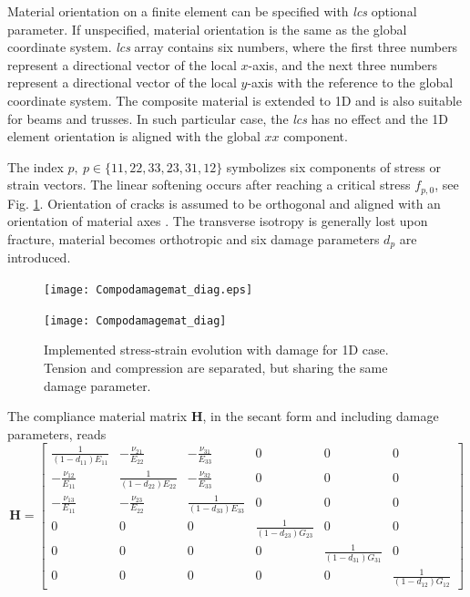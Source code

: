 \documentclass[a4paper]{article}
\newcommand{\param}[1]{{\it #1}}
\begin{document}
Material orientation on a finite element can be specified with \param{lcs} optional parameter. If unspecified, material orientation is the same as the global coordinate system. \param{lcs} array contains six numbers,
where the first three numbers represent a directional vector of the local $x$-axis, and the next three numbers represent a directional vector of the local $y$-axis with the reference to the global coordinate system. The composite material is extended to 1D and is also suitable for beams and trusses. In such particular case, the \param{lcs} has no effect and the 1D element orientation is aligned with the global $xx$ component.

The index $p,~p\in\{11,22,33,23,31,12\}$ symbolizes six components of stress or strain vectors. The linear softening occurs after reaching a critical stress $f_{p,0}$, see Fig. \ref{comp_softening}. Orientation of cracks is assumed to be orthogonal and aligned with an orientation of material axes \cite[pp.236]{Bazant:98}. The transverse isotropy is generally lost upon fracture, material becomes orthotropic and six damage parameters $d_p$ are introduced.

\begin{figure}[!htb]
\begin{htmlonly}
  \centerline{\texttt{[image: Compodamagemat\_diag.eps]}}
\end{htmlonly}
 \centerline{\texttt{[image: Compodamagemat\_diag]}}
  \caption{Implemented stress-strain evolution with damage for 1D case. Tension and compression are separated, but sharing the same damage parameter.}
  \label{comp_softening}
\end{figure}

The compliance material matrix $\mathbf{H}$, in the secant form and including damage parameters, reads
\footnotesize
\begin{equation}
\mathbf{H}=
\left[ \begin{array}{cccccc}
\frac{1}{(1-d_{11})E_{11}} & -\frac{\nu_{21}}{E_{22}} & -\frac{\nu_{31}}{E_{33}} &0 &0 & 0\\
-\frac{\nu_{12}}{E_{11}} & \frac{1}{(1-d_{22})E_{22}} & -\frac{\nu_{32}}{E_{33}} &0& 0&0\\
-\frac{\nu_{13}}{E_{11}} & -\frac{\nu_{23}}{E_{22}} & \frac{1}{(1-d_{33})E_{33}} &0 &0 &0 \\
 0&0 &0 & \frac{1}{(1-d_{23})G_{23}} & 0&0 \\
 0& 0& 0& 0& \frac{1}{(1-d_{31})G_{31}} & 0\\
 0& 0&0 &0& 0& \frac{1}{(1-d_{12})G_{12}}
\end{array} \right]\label{comp_eq_H}
\end{equation}
\normalsize
\end{document}
